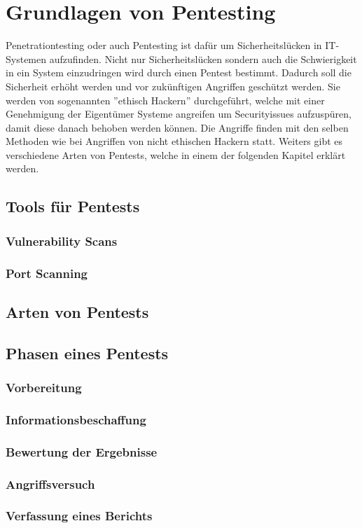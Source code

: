 \section{Grundlagen von Pentesting}

Penetrationtesting oder auch Pentesting ist dafür um Sicherheitslücken in IT-Systemen aufzufinden. Nicht nur Sicherheitslücken sondern auch die Schwierigkeit in ein System einzudringen wird durch einen Pentest bestimmt. Dadurch soll die Sicherheit erhöht werden und vor zukünftigen Angriffen geschützt werden. Sie werden von sogenannten ''ethisch Hackern'' durchgeführt, welche mit einer Genehmigung der Eigentümer Systeme angreifen um Securityissues aufzuspüren, damit diese danach behoben werden können. Die Angriffe finden mit den selben Methoden wie bei Angriffen von nicht ethischen Hackern statt. Weiters gibt es verschiedene Arten von Pentests, welche in einem der folgenden Kapitel erklärt werden.

\subsection{Tools für Pentests}

\subsubsection{Vulnerability Scans}

\subsubsection{Port Scanning}

\subsection{Arten von Pentests}

\subsection{Phasen eines Pentests}

\subsubsection{Vorbereitung}

\subsubsection{Informationsbeschaffung}

\subsubsection{Bewertung der Ergebnisse}

\subsubsection{Angriffsversuch}

\subsubsection{Verfassung eines Berichts}